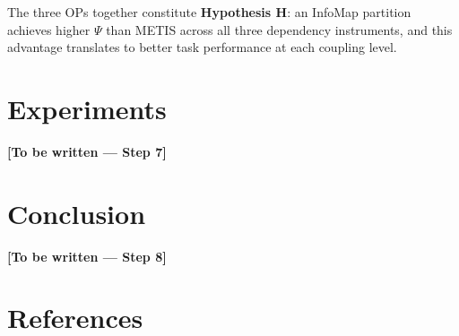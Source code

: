 \documentclass{article}
\begin{document}
\noindent The three OPs together constitute \textbf{Hypothesis H}: an InfoMap
partition achieves higher $\Psi$ than METIS across all three dependency instruments,
and this advantage translates to better task performance at each coupling level.

\section{Experiments}
\label{sec:experiments}
\label{sec:attnrange}
\textbf{[To be written — Step 7]}

\section{Conclusion}
\label{sec:conclusion}
\textbf{[To be written — Step 8]}

\begin{ack}
\end{ack}

\section*{References}
{
    \small
    
    
}

\appendix
\end{document}
